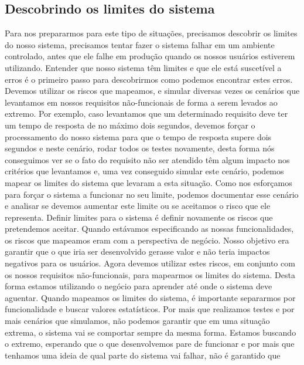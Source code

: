    \subsection{Descobrindo os limites do sistema}
      Para nos prepararmos para este tipo de situações, precisamos descobrir os
      limites do nosso sistema, precisamos tentar fazer o sistema falhar em um
      ambiente controlado, antes que ele falhe em produção quando os nossos usuários
      estiverem utilizando. Entender que nosso sistema têm limites e que ele está
      suscetível a erros é o primeiro passo para descobrirmos como podemos encontrar
      estes erros. Devemos utilizar os riscos que mapeamos, e simular diversas vezes
      os cenários que levantamos em nossos requisitos não-funcionais de forma a
      serem levados ao extremo. Por exemplo, caso levantamos que um determinado
      requisito deve ter um tempo de resposta de no máximo dois segundos, devemos
      forçar o processamento do nosso sistema para que o tempo de resposta supere
      dois segundos e neste cenário, rodar todos os testes novamente, desta forma nós
      conseguimos ver se o fato do requisito não ser atendido têm algum impacto nos
      critérios que levantamos e, uma vez conseguido simular este cenário, podemos
      mapear os limites do sistema que levaram a esta situação. Como nos esforçamos
      para forçar o sistema a funcionar no seu limite, podemos documentar esse cenário
      e analisar se devemos aumentar este limite ou se aceitamos o risco que ele
      representa. Definir limites para o sistema é definir novamente os riscos que
      pretendemos aceitar. Quando estávamos especificando as nossas funcionalidades,
      os riscos que mapeamos eram com a perspectiva de negócio. Nosso objetivo era
      garantir que o que iria ser desenvolvido gerasse valor e não teria impactos
      negativos para os usuários. Agora devemos utilizar estes riscos, em conjunto
      com os nossos requisitos não-funcionais, para mapearmos os limites do sistema.
      Desta forma estamos utilizando o negócio para aprender até onde o sistema
      deve aguentar. \newline
      Quando mapeamos os limites do sistema, é importante separarmos por funcionalidade
      e buscar valores estatísticos. Por mais que realizamos testes e por mais
      cenários que simulamos, não podemos garantir que em uma situação extrema,
      o sistema vai se comportar sempre da mesma forma. Estamos buscando o
      extremo, esperando que o que desenvolvemos pare de funcionar e por mais que
      tenhamos uma ideia de qual parte do sistema vai falhar, não é garantido que
